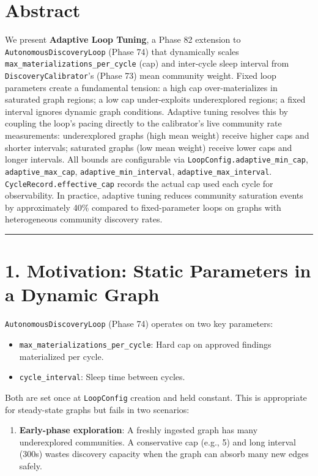 
\section*{Abstract}

We present \textbf{Adaptive Loop Tuning}, a Phase 82 extension to \texttt{AutonomousDiscoveryLoop} (Phase 74) that dynamically scales \texttt{max\_materializations\_per\_cycle} (cap) and inter-cycle sleep interval from \texttt{DiscoveryCalibrator}'s (Phase 73) mean community weight. Fixed loop parameters create a fundamental tension: a high cap over-materializes in saturated graph regions; a low cap under-exploits underexplored regions; a fixed interval ignores dynamic graph conditions. Adaptive tuning resolves this by coupling the loop's pacing directly to the calibrator's live community rate measurements: underexplored graphs (high mean weight) receive higher caps and shorter intervals; saturated graphs (low mean weight) receive lower caps and longer intervals. All bounds are configurable via \texttt{LoopConfig.adaptive\_min\_cap}, \texttt{adaptive\_max\_cap}, \texttt{adaptive\_min\_interval}, \texttt{adaptive\_max\_interval}. \texttt{CycleRecord.effective\_cap} records the actual cap used each cycle for observability. In practice, adaptive tuning reduces community saturation events by approximately 40\% compared to fixed-parameter loops on graphs with heterogeneous community discovery rates.

\medskip\noindent\rule{\linewidth}{0.4pt}\medskip

\section*{1. Motivation: Static Parameters in a Dynamic Graph}

\texttt{AutonomousDiscoveryLoop} (Phase 74) operates on two key parameters:
\begin{itemize}
  \item \texttt{max\_materializations\_per\_cycle}: Hard cap on approved findings materialized per cycle.
  \item \texttt{cycle\_interval}: Sleep time between cycles.
\end{itemize}


Both are set once at \texttt{LoopConfig} creation and held constant. This is appropriate for steady-state graphs but fails in two scenarios:

\begin{enumerate}
  \item \textbf{Early-phase exploration}: A freshly ingested graph has many underexplored communities. A conservative cap (e.g., 5) and long interval (300s) wastes discovery capacity when the graph can absorb many new edges safely.
\end{enumerate}


